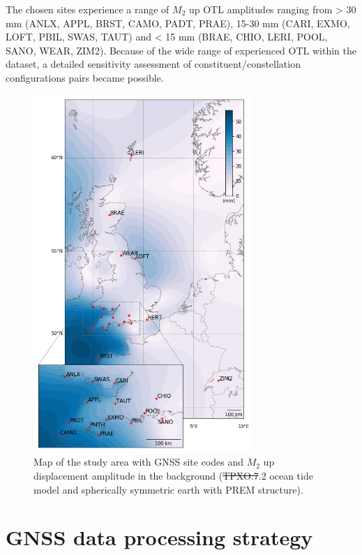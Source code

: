 \documentclass[se, manuscript]{copernicus}
\providecommand{\DIFadd}[1]{{\protect\color{blue}\uwave{#1}}} %
\providecommand{\DIFdel}[1]{{\protect\color{red}\sout{#1}}}                      %
\providecommand{\DIFaddFL}[1]{\DIFadd{#1}} %
\providecommand{\DIFdelFL}[1]{\DIFdel{#1}} %
\providecommand{\DIFaddbeginFL}{} %
\providecommand{\DIFaddendFL}{} %
\providecommand{\DIFdelbeginFL}{} %
\providecommand{\DIFdelendFL}{} %
\begin{document}
The chosen sites experience a range of $M_2$ up OTL amplitudes ranging from > 30 mm (ANLX, APPL, BRST, CAMO, PADT, PRAE), 15-30 mm (CARI, EXMO, LOFT, PBIL, SWAS, TAUT) and < 15 mm (BRAE, CHIO, LERI, POOL, SANO, WEAR, ZIM2). Because of the wide range of experienced OTL within the dataset, a detailed sensitivity assessment of constituent/constellation configurations pairs became possible.

\begin{figure}[t]
\DIFdelbeginFL %
\DIFdelendFL \DIFaddbeginFL \includegraphics[width=8.3cm]{fig01_updated.png}
\DIFaddendFL \caption{Map of the study area with GNSS site codes and $M_2$ up displacement amplitude in the background (\DIFdelbeginFL \DIFdelFL{TPXO.7}\DIFdelendFL \DIFaddbeginFL \DIFaddFL{TPXO7}\DIFaddendFL .2 ocean tide model and spherically symmetric earth with PREM structure).}
\end{figure}

\section{GNSS data processing strategy}
\end{document}
